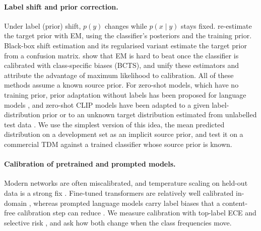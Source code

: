 \paragraph{Label shift and prior correction.}
Under label (prior) shift, $p(y)$ changes while $p(x\mid y)$ stays fixed. \citet{saerens2002adjusting} re-estimate the
target prior with EM, using the classifier's posteriors and the training prior. Black-box shift estimation
\citep{lipton2018detecting} and its regularised variant \citep{azizzadenesheli2019regularized} estimate the target
prior from a confusion matrix. \citet{alexandari2020maximum} show that EM is hard to beat once the classifier is
calibrated with class-specific biases (BCTS), and \citet{garg2020unified} unify these estimators and attribute the
advantage of maximum likelihood to calibration. All of these methods assume a known source prior. For zero-shot
models, which have no training prior, prior adaptation without labels has been proposed for language models
\citep{estienne2023unsupervised}, and zero-shot CLIP models have been adapted to a given label-distribution prior
\citep{kahana2022improving} or to an unknown target distribution estimated from unlabelled test data
\citep{han2026labelshift}. We use the simplest
version of this idea, the mean predicted distribution on a development set as an implicit source prior, and test it
on a commercial TDM against a trained classifier whose source prior is known.

\paragraph{Calibration of pretrained and prompted models.}
Modern networks are often miscalibrated, and temperature scaling on held-out data is a strong fix
\citep{guo2017calibration}. Fine-tuned transformers are relatively well calibrated in-domain \citep{desai2020calibration},
whereas prompted language models carry label biases that a content-free calibration step can reduce
\citep{zhao2021calibrate}. We measure calibration with top-label ECE and selective risk \citep{geifman2017selective}, and
ask how both change when the class frequencies move.


